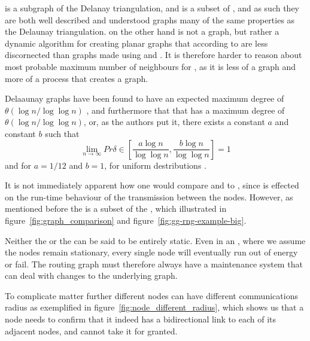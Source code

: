 \gabe is a subgraph of the Delanay triangulation, and \rng is a subset of \gabe {}, and as such they are both well described and understood graphs many of the same properties as the Delaunay triangulation. \cldp on the other hand is not a graph, but rather a dynamic algorithm for creating planar graphs that according to \cite{practical} are less discornected than graphs made using \gabe and \rng. It is therefore harder to reason about most probable maximum number of neighbours for \cldp, as it is less of a graph and more of a process that creates a graph. 


Delaaunay graphs have been found to have an expected maximum degree of $\theta(\log n / \log \log n)$ \cite{delExpected}, and furthermore that that \gabe has a maximum degree of $\theta(\log n / \log \log n)$, or, as the authors put it, there exists a constant $a$ and constant $b$ such that 
$$
\lim_{n \rightarrow \infty} Pr{\delta \in [\frac{a\log n}{\log \log n}, \frac{b\log n}{\log \log n}]} = 1
$$
and for \gabe $a = 1/12$ and $b = 1$, for uniform destributions \cite{GGExpected}.

It is not immediately apparent how one would compare \gabe and \rng to \cldp, since \cldp is effected on the run-time behaviour of the transmission between the nodes. However, as mentioned before the \rng is a subset of the \gabe, which illustrated in figure~\ref{fig:graph_comparison} and figure~\ref{fig:gg-rng-example-big}.


Neither the \manet or the \anet can be said to be entirely static. Even in an \anet, where we assume the nodes remain stationary, every single node will eventually run out of energy or fail. The routing graph must therefore always have a maintenance system that can deal with changes to the underlying graph. 

To complicate matter further different nodes can have different communications radius as exemplified in figure~\ref{fig:node_different_radius}, which shows us that a node needs to confirm that it indeed has a bidirectional link to each of its adjacent nodes, and cannot take it for granted.

